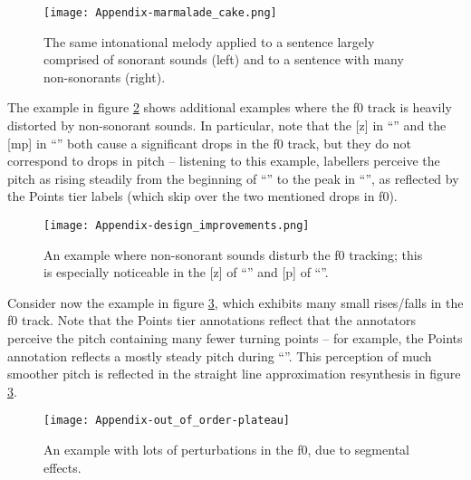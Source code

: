 \begin{figure}[H]
\centering
%
\texttt{[image: Appendix-marmalade\_cake.png]}
%
\caption{The same intonational melody applied to a sentence largely comprised of sonorant sounds (left) and to a sentence with many non-sonorants (right).%
\label{fig:marmalade cake f0-tracking}%
%
}
\end{figure}

The example in figure \ref{fig:design improvements f0-tracking} shows additional examples where the f0 track is heavily distorted by non-sonorant sounds.  In particular, note that the [z] in “” and the [mp] in “” both cause a significant drops in the f0 track, but they do not correspond to drops in pitch – listening to this example, labellers perceive the pitch as rising steadily from the beginning of “” to the peak in “”, as reflected by the Points tier labels (which skip over the two mentioned drops in f0).

\begin{figure}[H]
\centering
%
\texttt{[image: Appendix-design\_improvements.png]}
%
\caption{An example where non-sonorant sounds disturb the f0 tracking; this is especially noticeable in the [z] of “” and [p] of “”.%
\label{fig:design improvements f0-tracking}%
%
}
\end{figure}

Consider now the example in figure \ref{fig:out of order-plateau f0-tracking}, which exhibits many small rises\slash falls in the f0 track. Note that the Points tier annotations reflect that the annotators perceive the pitch containing many fewer turning points – for example, the Points annotation reflects a mostly steady pitch during “”. This perception of much smoother pitch is reflected in the straight line approximation resynthesis in figure \ref{fig:out of order-plateau f0-tracking}.

\begin{figure}[H]
\centering
%
\texttt{[image: Appendix-out\_of\_order-plateau]}
%
\caption{An example with lots of perturbations in the f0, due to segmental effects.%
\label{fig:out of order-plateau f0-tracking}%
%
}
\end{figure}


